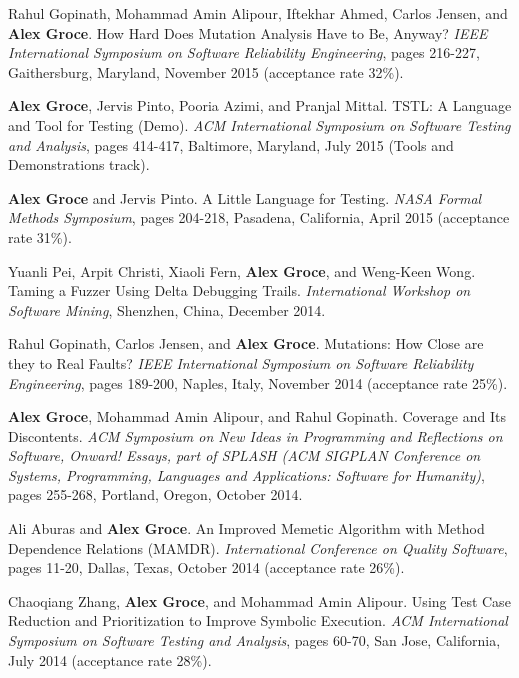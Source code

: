 \documentclass[ComputerScience]{vita}
\begin{document}
\begin{vita}
\begin{Refereed Conference and Workshop Publications}
\item Rahul Gopinath, Mohammad Amin Alipour, Iftekhar Ahmed, Carlos Jensen, and {\bf Alex Groce}.
\newblock How Hard Does Mutation Analysis Have to Be, Anyway?
\newblock \emph{IEEE International Symposium on Software Reliability Engineering}, pages 216-227, Gaithersburg, Maryland, November 2015 (acceptance rate 32\%).


\item {\bf Alex Groce}, Jervis Pinto, Pooria Azimi, and Pranjal Mittal.
\newblock TSTL: A Language and Tool for Testing (Demo).
\newblock \emph{ACM International Symposium on Software Testing and Analysis}, pages 414-417, Baltimore, Maryland, July 2015 (Tools and Demonstrations track). 

\item {\bf Alex Groce} and Jervis Pinto.
\newblock A Little Language for Testing.
\newblock \emph{NASA Formal Methods Symposium}, pages 204-218, Pasadena, California, April 2015 (acceptance rate 31\%).

\item Yuanli Pei, Arpit Christi, Xiaoli Fern, {\bf Alex Groce}, and Weng-Keen Wong.
\newblock Taming a Fuzzer Using Delta Debugging Trails.
\newblock \emph{International Workshop on Software Mining}, Shenzhen, China, December 2014.

\item Rahul Gopinath, Carlos Jensen, and {\bf Alex Groce}.
\newblock Mutations: How Close are they to Real Faults?
\newblock \emph{IEEE International Symposium on Software Reliability Engineering}, pages 189-200, Naples, Italy, November 2014 (acceptance rate 25\%).

\item
{\bf Alex Groce}, Mohammad Amin Alipour, and Rahul Gopinath.
\newblock Coverage and Its Discontents.
\newblock \emph{ACM Symposium on New Ideas in Programming and Reflections on Software, Onward! Essays, part of SPLASH (ACM SIGPLAN Conference on Systems, Programming, Languages and Applications: Software for Humanity)}, pages 255-268, Portland, Oregon, October 2014.

\item
Ali Aburas and {\bf Alex Groce}.
\newblock An Improved Memetic Algorithm with Method Dependence Relations (MAMDR).
\newblock \emph{International Conference on Quality Software}, pages 11-20, Dallas, Texas, October 2014 (acceptance rate 26\%).

\item
Chaoqiang Zhang, {\bf Alex Groce}, and Mohammad Amin Alipour.
\newblock Using Test Case Reduction and Prioritization to Improve Symbolic Execution.
\newblock \emph{ACM International Symposium on Software Testing and Analysis}, pages 60-70, San Jose, California, July 2014 (acceptance rate 28\%).


\end{Refereed Conference and Workshop Publications}
\end{vita}
\end{document}
